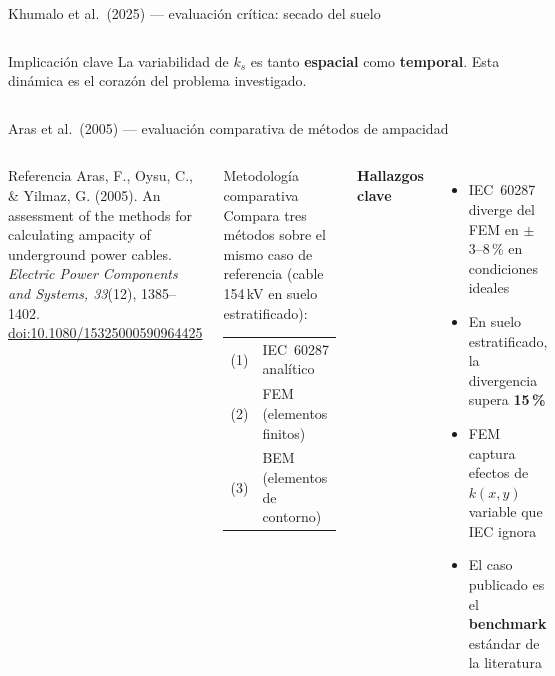 \documentclass[aspectratio=169]{beamer}
\begin{document}
\begin{frame}{Khumalo et al.\ (2025) --- evaluación crítica: secado del suelo}
\begin{columns}[T]
\vspace{0.2em}
\begin{exampleblock}{\scriptsize Implicación clave}\scriptsize
La variabilidad de $k_s$ es tanto \textbf{espacial} como \textbf{temporal}.
Esta dinámica es el corazón del problema investigado.
\end{exampleblock}
\end{columns}
\end{frame}

\begin{frame}{Aras et al.\ (2005) --- evaluación comparativa de métodos de ampacidad}
\begin{columns}[T]
\begin{block}{\scriptsize Referencia}
\scriptsize Aras, F., Oysu, C., \& Yilmaz, G. (2005). An assessment of the
methods for calculating ampacity of underground power cables.
\textit{Electric Power Components and Systems, 33}(12), 1385--1402.
\href{https://doi.org/10.1080/15325000590964425}{doi:10.1080/15325000590964425}
\end{block}

\vspace{0.15em}
\begin{block}{\scriptsize Metodología comparativa}
\scriptsize Compara tres métodos sobre el mismo caso de referencia
(cable 154\,kV en suelo estratificado):\\[2pt]
\begin{tabular}{ll}\scriptsize
  (1) & IEC~60287 analítico \\
  (2) & FEM (elementos finitos) \\
  (3) & BEM (elementos de contorno)\\
\end{tabular}
\end{block}

\vspace{0.15em}


\centering
\textbf{\small Hallazgos clave}
\begin{itemize}[leftmargin=*]\scriptsize
  \item IEC~60287 diverge del FEM en $\pm$3--8\,\% en condiciones ideales
  \item En suelo estratificado, la divergencia supera \textbf{15\,\%}
  \item FEM captura efectos de $k(x,y)$ variable que IEC ignora
  \item El caso publicado es el \textbf{benchmark} estándar de la literatura
\end{itemize}


\end{columns}
\end{frame}
\end{document}
